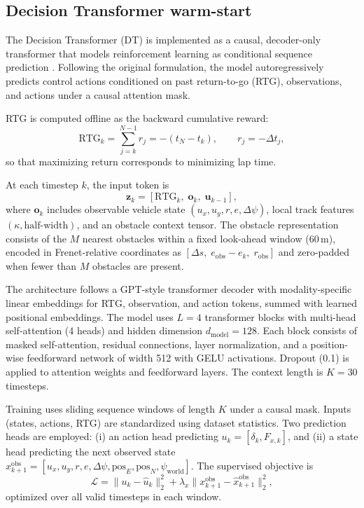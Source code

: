 \documentclass{article}
\begin{document}
\subsection{Decision Transformer warm-start}

The Decision Transformer (DT) is implemented as a causal, decoder-only transformer that models reinforcement learning as conditional sequence prediction \cite{chen2021decision}. Following the original formulation, the model autoregressively predicts control actions conditioned on past return-to-go (RTG), observations, and actions under a causal attention mask.

RTG is computed offline as the backward cumulative reward:
\begin{equation}
\mathrm{RTG}_k=\sum_{j=k}^{N-1} r_j = -\left(t_N-t_k\right), 
\qquad r_j=-\Delta t_j,
\end{equation}
so that maximizing return corresponds to minimizing lap time.

At each timestep $k$, the input token is
\begin{equation}
\mathbf{z}_k = [\mathrm{RTG}_k,\; \mathbf{o}_k,\; \mathbf{u}_{k-1}],
\end{equation}
where $\mathbf{o}_k$ includes observable vehicle state $(u_x,u_y,r,e,\Delta\psi)$, local track features $(\kappa,\text{half-width})$, and an obstacle context tensor. The obstacle representation consists of the $M$ nearest obstacles within a fixed look-ahead window (60\,m), encoded in Frenet-relative coordinates as $[\Delta s,\; e_{\text{obs}}-e_k,\; r_{\text{obs}}]$ and zero-padded when fewer than $M$ obstacles are present.

The architecture follows a GPT-style transformer decoder \cite{vaswani2017attention,radford2019language} with modality-specific linear embeddings for RTG, observation, and action tokens, summed with learned positional embeddings. The model uses $L=4$ transformer blocks with multi-head self-attention (4 heads) and hidden dimension $d_{\text{model}}=128$. Each block consists of masked self-attention, residual connections, layer normalization, and a position-wise feedforward network of width 512 with GELU activations. Dropout (0.1) is applied to attention weights and feedforward layers. The context length is $K=30$ timesteps.

Training uses sliding sequence windows of length $K$ under a causal mask. Inputs (states, actions, RTG) are standardized using dataset statistics. Two prediction heads are employed: 
(i) an action head predicting $u_k=[\delta_k,F_{x,k}]$, and 
(ii) a state head predicting the next observed state $x^{\text{obs}}_{k+1}=[u_x,u_y,r,e,\Delta\psi,\text{pos}_E,\text{pos}_N,\psi_{\text{world}}]$. 
The supervised objective is
\begin{equation}
\mathcal{L}
= \|u_k-\hat u_k\|_2^2
+ \lambda_x\|x^{\text{obs}}_{k+1}-\hat x^{\text{obs}}_{k+1}\|_2^2,
\end{equation}
optimized over all valid timesteps in each window.
\end{document}

